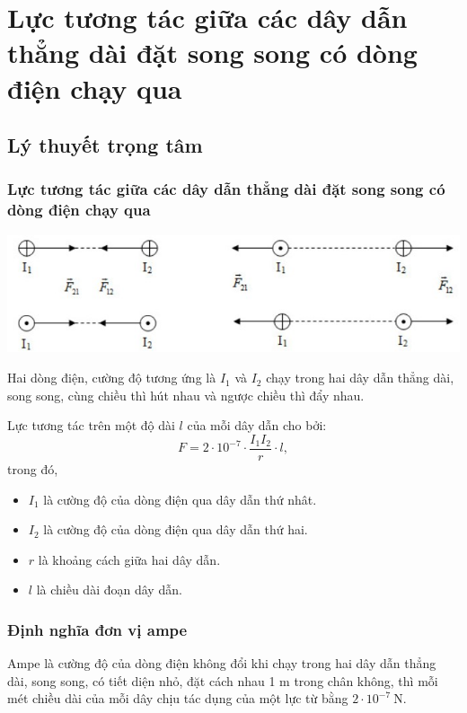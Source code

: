 \chapter{Lực tương tác giữa các dây dẫn thẳng dài đặt song song có dòng điện chạy qua}
\section{Lý thuyết trọng tâm}
\subsection{Lực tương tác giữa các dây dẫn thẳng dài đặt song song có dòng điện chạy qua}

\begin{center}
	\includegraphics[scale=0.8]{../figs/VN11-PH-25-L-017-2-h102.jpg}
\end{center}
Hai dòng điện, cường độ tương ứng là $I_1$ và $I_2$ chạy trong hai dây dẫn thẳng dài, song song, cùng chiều thì hút nhau và ngược chiều thì đẩy nhau. 

Lực tương tác trên một độ dài $l$ của mỗi dây dẫn cho bởi:
	\begin{equation}
	F=2\cdot 10^{-7}\cdot \dfrac{I_1I_2}{r}\cdot l,
	\end{equation}
	trong đó,
	\begin{itemize}
		\item $I_1$ là cường độ của dòng điện qua dây dẫn thứ nhât. 
		\item $I_2$ là cường độ của dòng điện qua dây dẫn thứ hai. 
		\item $r$ là khoảng cách giữa hai dây dẫn.
		\item $l$ là chiều dài đoạn dây dẫn. 
	\end{itemize}
	
\subsection{Định nghĩa đơn vị ampe}

Ampe là cường độ của dòng điện không đổi khi chạy trong hai dây dẫn thẳng dài, song song, có tiết diện nhỏ, đặt cách nhau 1 m trong chân không, thì mỗi mét chiều dài của mỗi dây chịu tác dụng của một lực từ bằng $2\cdot 10^{-7}\ \text{N}$.

